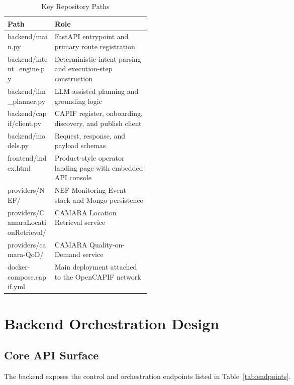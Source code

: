 \documentclass[conference]{IEEEtran}
\begin{document}
\begin{table}[h]
\caption{Key Repository Paths}
\label{tab:repo}
\centering
\small
\begin{tabularx}{\linewidth}{>{\ttfamily\raggedright\arraybackslash}p{0.33\linewidth} X}
\toprule
\textbf{Path} & \textbf{Role} \\
\midrule
backend/main.py & FastAPI entrypoint and primary route registration \\
backend/intent\_engine.py & Deterministic intent parsing and execution-step construction \\
backend/llm\_planner.py & LLM-assisted planning and grounding logic \\
backend/capif/client.py & CAPIF register, onboarding, discovery, and publish client \\
backend/models.py & Request, response, and payload schemas \\
frontend/index.html & Product-style operator landing page with embedded API console \\
providers/NEF/ & NEF Monitoring Event stack and Mongo persistence \\
providers/CamaraLocationRetrieval/ & CAMARA Location Retrieval service \\
providers/camara-QoD/ & CAMARA Quality-on-Demand service \\
docker-compose.capif.yml & Main deployment attached to the OpenCAPIF network \\
\bottomrule
\end{tabularx}
\end{table}

\section{Backend Orchestration Design}

\subsection{Core API Surface}

The backend exposes the control and orchestration endpoints listed in Table~\ref{tab:endpoints}.
\end{document}
